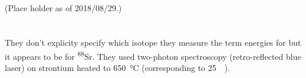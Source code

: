 \documentclass{article}
\newcommand{\tsup}{\textsuperscript}													%
\newcommand{\Sr}[1]{\tsup{#1}\textnormal{Sr}}											%
\begin{document}
\section{}

(Place holder as of 2018/08/29.)


\section{}

They don't explicity specify which isotope they measure the term energies for but it appears to be for \Sr{88}. They used two-photon spectroscopy (retro-reflected blue laser) on strontium heated to \SI{650}{\celsius} (corresponding to \SI{25}{\milli\Torr}). 

\section{}

\section{}

\section{}

\section{}
 
\printbibliography
\end{document}
